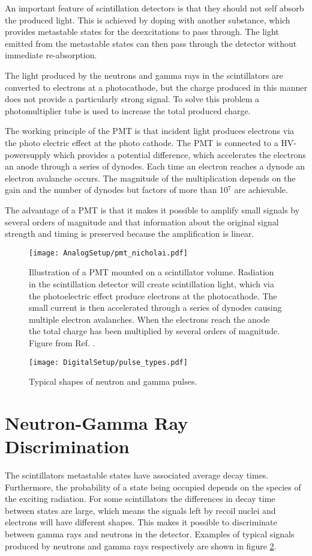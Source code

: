 \documentclass[main.tex]{subfiles}
\begin{document}
An important feature of scintillation detectors is that they should not self absorb the produced light. This is achieved by doping with another substance, which provides metastable states for the deexcitations to pass through. The light emitted from the metastable states can then pass through the detector without immediate re-absorption.

The light produced by the neutrons and gamma rays in the scintillators are converted to electrons at a photocathode, but the charge produced in this manner does not provide a particularly strong signal. To solve this problem a photomultiplier tube is used to increase the total produced charge. 

The working principle of the PMT is that incident light produces electrons via the photo electric effect at the photo cathode. The PMT is connected to a HV-powersupply which provides a potential difference, which accelerates the electrons an anode through a series of dynodes. Each time an electron reaches a dynode an electron avalanche occurs. The magnitude of the multiplication depends on the gain and the number of dynodes but factors of more than 10$^\text{7}$ are achievable. 

The advantage of a PMT is that it makes it possible to amplify small signals by several orders of magnitude and that information about the original signal strength and timing is preserved because the amplification is linear.

\begin{figure}[ht]
	\centering
    	\texttt{[image: AnalogSetup/pmt\_nicholai.pdf]}
        \caption[Illustration of a PMT]{Illustration of a PMT mounted on a scintillator volume. Radiation in the scintillation detector will create scintillation light, which via the photoelectric effect produce electrons at the photocathode. The small current is then accelerated through a series of dynodes causing multiple electron avalanches. When the electrons reach the anode the total charge has been multiplied by several orders of magnitude. Figure from Ref. \cite{Mauritzsson}.}
	    \label{fig:pmt} 
\end{figure}

\begin{figure}[ht]
	\centering
    	\texttt{[image: DigitalSetup/pulse\_types.pdf]}
        \caption{Typical shapes of neutron and gamma pulses.}
	    \label{fig:pulse_types} 
\end{figure}
\section{Neutron-Gamma Ray Discrimination}
The scintillators metastable states have associated average decay times. Furthermore, the probability of a state being occupied depends on the species of the exciting radiation\cite[pg.171]{Krane}. For some scintillators the differences in decay time between states are large, which means the signals left by recoil nuclei and electrons will have different shapes. This makes it possible to discriminate between gamma rays and neutrons in the detector. Examples of typical signals produced by neutrons and gamma rays respectively are shown in figure \ref{fig:pulse_types}.
\end{document}
